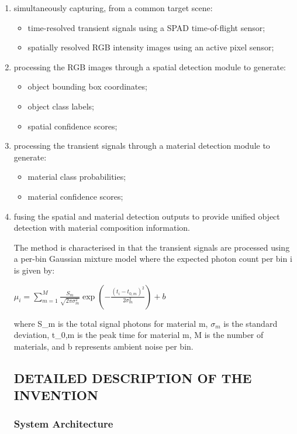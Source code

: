 \documentclass[11pt,a4paper]{article}
\begin{document}
\begin{enumerate}[leftmargin=*,label=\alph*)]
\item simultaneously capturing, from a common target scene:
\begin{itemize}[leftmargin=*]
\item time-resolved transient signals using a SPAD time-of-flight sensor;
\item spatially resolved RGB intensity images using an active pixel sensor;
\end{itemize}

\item processing the RGB images through a spatial detection module to generate:
\begin{itemize}[leftmargin=*]
\item object bounding box coordinates;
\item object class labels;
\item spatial confidence scores;
\end{itemize}

\item processing the transient signals through a material detection module to generate:
\begin{itemize}[leftmargin=*]
\item material class probabilities;
\item material confidence scores;
\end{itemize}

\item fusing the spatial and material detection outputs to provide unified object detection with material composition information.

The method is characterised in that the transient signals are processed using a per-bin Gaussian mixture model where the expected photon count per bin i is given by:

$\mu_i = \sum_{m=1}^{M} \frac{S_m}{\sqrt{2\pi\sigma_m^2}} \exp\left(-\frac{(t_i - t_{0,m})^2}{2\sigma_m^2}\right) + b$

where S_m is the total signal photons for material m, $\sigma_{m}$ is the standard deviation, t_{0,m} is the peak time for material m, M is the number of materials, and b represents ambient noise per bin.

\vspace{0.5em}
\subsection{DETAILED DESCRIPTION OF THE INVENTION}

\subsubsection{System Architecture}


\end{enumerate}
\end{document}
